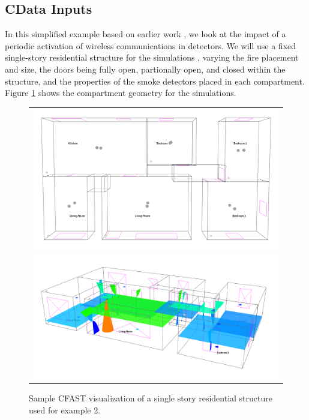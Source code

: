 \documentclass[12pt,twoside]{book}
\begin{document}
\subsection{CData Inputs}
In this simplified example based on earlier work \cite{Cleary_2019}, we look at the impact of a periodic activation of wireless communications in detectors. We will use a fixed single-story residential structure for the simulations \cite{Madrzykowski:2019}, varying the fire placement and size, the doors being fully open, partionally open, and closed within the structure, and the properties of the smoke detectors placed in each compartment. Figure \ref{detector_geometry} shows the compartment geometry for the simulations.

\begin{figure}[!ht]
\centering
\begin{tabular*}{\textwidth}{c}
\includegraphics[width=6.0in]{FIGURES/Detectors.png} \\
\includegraphics[width=6.0in]{FIGURES/Detectors_Running.png}
\end{tabular*}
\caption{Sample CFAST visualization of a single story residential structure used for example 2.}
\label{detector_geometry}
\end{figure}
\end{document}
